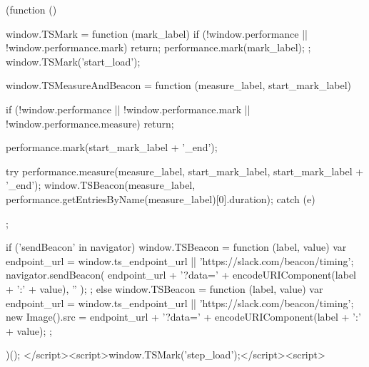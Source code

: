 (function () {
	
	window.TSMark = function (mark_label) {
		if (!window.performance || !window.performance.mark) return;
		performance.mark(mark_label);
	};
	window.TSMark('start_load');

	
	window.TSMeasureAndBeacon = function (measure_label, start_mark_label) {
		if (!window.performance || !window.performance.mark || !window.performance.measure) {
			return;
		}

		performance.mark(start_mark_label + '_end');

		try {
			performance.measure(measure_label, start_mark_label, start_mark_label + '_end');
			window.TSBeacon(measure_label, performance.getEntriesByName(measure_label)[0].duration);
		} catch (e) {
			
		}
	};

	
	if ('sendBeacon' in navigator) {
		window.TSBeacon = function (label, value) {
			var endpoint_url = window.ts_endpoint_url || 'https://slack.com/beacon/timing';
			navigator.sendBeacon(
				endpoint_url + '?data=' + encodeURIComponent(label + ':' + value),
				''
			);
		};
	} else {
		window.TSBeacon = function (label, value) {
			var endpoint_url = window.ts_endpoint_url || 'https://slack.com/beacon/timing';
			new Image().src = endpoint_url + '?data=' + encodeURIComponent(label + ':' + value);
		};
	}
})();
</script><script>window.TSMark('step_load');</script><script>
